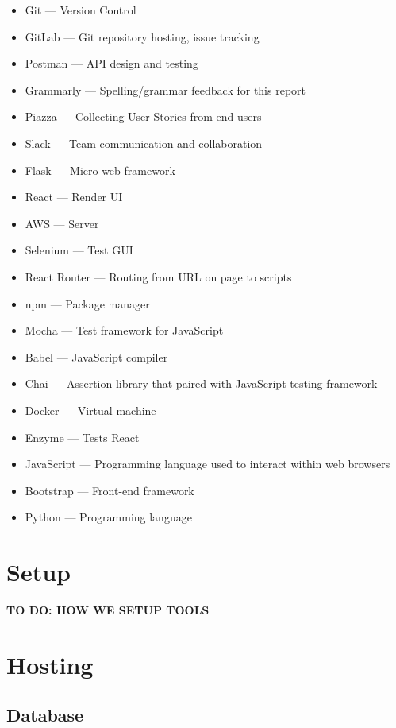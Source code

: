 \documentclass[12pt]{article}
\begin{document}
\begin{itemize}
	\item Git		    --- Version Control
	\item GitLab		--- Git repository hosting, issue tracking
	\item Postman		--- API design and testing %
	\item Grammarly		--- Spelling/grammar feedback for this report
	\item Piazza		--- Collecting User Stories from end users
	\item Slack			--- Team communication and collaboration
	\item Flask     	--- Micro web framework
	\item React     	--- Render UI
	\item AWS       	--- Server
	\item Selenium 		--- Test GUI
	\item React Router 	--- Routing from URL on page to scripts
	\item npm 			--- Package manager
	\item Mocha 		--- Test framework for JavaScript
	\item Babel 		--- JavaScript compiler
	\item Chai 			--- Assertion library that paired with JavaScript testing framework
	\item Docker 		--- Virtual machine
	\item Enzyme 		--- Tests React
	\item JavaScript 	--- Programming language used to interact within web browsers
	\item Bootstrap 	--- Front-end framework
	\item Python 		--- Programming language

\end{itemize}

\section{Setup}

\textbf{TO DO: HOW WE SETUP TOOLS}

\section{Hosting}

\subsection{Database}
\end{document}
